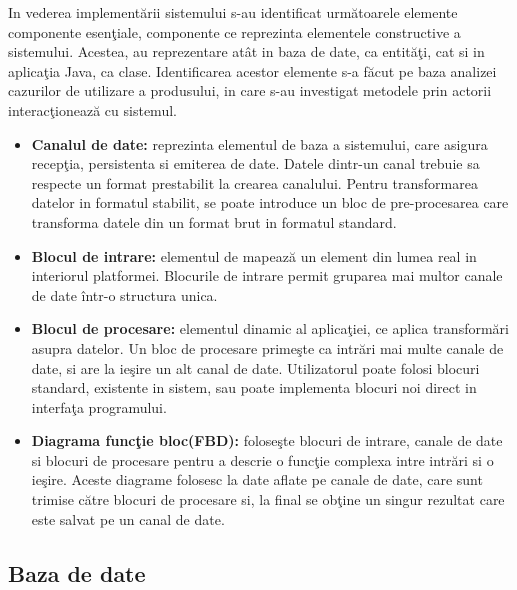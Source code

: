 In vederea implementării sistemului s-au identificat următoarele elemente componente esenţiale, componente ce reprezinta elementele constructive a sistemului. Acestea, au reprezentare atât in baza de date, ca entităţi, cat si in aplicaţia Java, ca clase. Identificarea acestor elemente s-a făcut pe baza analizei cazurilor de utilizare a produsului, in care s-au investigat metodele prin actorii interacţionează cu sistemul.
\begin{itemize}
\label{list:entities}
\item \textbf{Canalul de date:} reprezinta elementul de baza a sistemului, care asigura recepţia, persistenta si emiterea de date. Datele dintr-un canal trebuie sa respecte un format prestabilit la crearea canalului. Pentru transformarea datelor in formatul stabilit, se poate introduce un bloc de pre-procesarea care transforma datele din un format brut in formatul standard.
\item \textbf{Blocul de intrare:} elementul de mapează un element din lumea real in interiorul platformei. Blocurile de intrare permit gruparea mai multor canale de date într-o structura unica.
\item \textbf{Blocul de procesare:} elementul dinamic al aplicaţiei, ce aplica transformări asupra datelor. Un bloc de procesare primeşte ca intrări mai multe canale de date, si are la ieşire un alt canal de date. Utilizatorul poate folosi blocuri standard, existente in sistem, sau poate implementa blocuri noi direct in interfaţa programului.
\item \textbf{Diagrama funcţie bloc(FBD):}  foloseşte blocuri de intrare, canale de date si blocuri de procesare pentru a descrie o funcţie complexa intre intrări si o ieşire. Aceste diagrame folosesc la date aflate pe canale de date, care sunt trimise către blocuri de procesare si, la final se obţine un singur rezultat care este salvat pe un canal de date.
\end{itemize}

\subsection{Baza de date}

